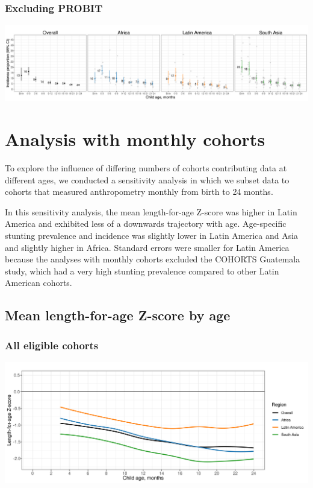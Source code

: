 \documentclass[
  9pt,
]{book}
\begin{document}
\hypertarget{excluding-probit-2}{%
\subsection{Excluding PROBIT}\label{excluding-probit-2}}

\includegraphics[width=66.67in]{figures//stunting/fig-stunt-2-inc-overall_region--allage-primary}

\hypertarget{monthly}{%
\chapter{Analysis with monthly cohorts}\label{monthly}}

\raggedright

To explore the influence of differing numbers of cohorts contributing data at different ages, we conducted a sensitivity analysis in which we subset data to cohorts that measured anthropometry monthly from birth to 24 months.

In this sensitivity analysis, the mean length-for-age Z-score was higher in Latin America and exhibited less of a downwards trajectory with age. Age-specific stunting prevalence and incidence was slightly lower in Latin America and Asia and slightly higher in Africa. Standard errors were smaller for Latin America because the analyses with monthly cohorts excluded the COHORTS Guatemala study, which had a very high stunting prevalence compared to other Latin American cohorts.

\hypertarget{mean-length-for-age-z-score-by-age-2}{%
\section{Mean length-for-age Z-score by age}\label{mean-length-for-age-z-score-by-age-2}}

\hypertarget{all-eligible-cohorts}{%
\subsection{All eligible cohorts}\label{all-eligible-cohorts}}

\includegraphics[width=41.67in]{figures//stunting/fig-laz-2-mean-overall_region--allage-primary}
\end{document}
